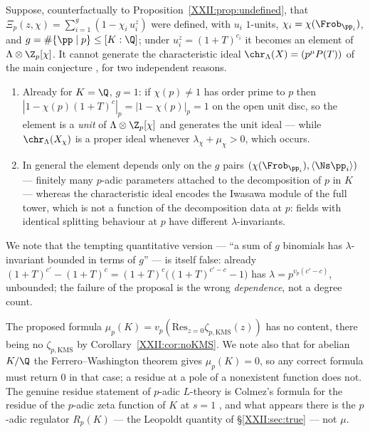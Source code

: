 \begin{proposition}\label{XXII:prop:bounded}
Suppose, counterfactually to Proposition~\ref{XXII:prop:undefined}, that
$\Xi_p(z,\chi)=\sum_{i=1}^g(1-\chi_i\,u_i^z)$ were defined, with $u_i$ $1$-units,
$\chi_i=\chi(\Frob_{\pp_i})$, and $g=\#\{\pp\mid p\}\le[K:\Q]$; under $u_i^z=(1+T)^{c_i}$ it
becomes an element of $\Lambda\otimes\Z_p[\chi]$. It cannot generate the characteristic
ideal $\chr_\Lambda(X)=(p^{\mu}P(T))$ of the main conjecture \cite{MazurWiles}, for two
independent reasons.
\begin{enumerate}
\item Already for $K=\Q$, $g=1$: if $\chi(p)\ne1$ has order prime to $p$ then
$|1-\chi(p)(1+T)^{c}|_p=|1-\chi(p)|_p=1$ on the open unit disc, so the element is a
\emph{unit} of $\Lambda\otimes\Z_p[\chi]$ and generates the unit ideal --- while
$\chr_\Lambda(X_\chi)$ is a proper ideal whenever $\lambda_\chi+\mu_\chi>0$, which occurs.
\item In general the element depends only on the $g$ pairs
$(\chi(\Frob_{\pp_i}),\langle\Ns\pp_i\rangle)$ --- finitely many $p$-adic parameters
attached to the decomposition of $p$ in $K$ --- whereas the characteristic ideal encodes the
Iwasawa module of the full tower, which is not a function of the decomposition data at $p$:
fields with identical splitting behaviour at $p$ have different $\lambda$-invariants.
\end{enumerate}
We note that the tempting quantitative version --- ``a sum of $g$ binomials has
$\lambda$-invariant bounded in terms of $g$'' --- is itself false: already
$(1+T)^{c'}-(1+T)^{c}=(1+T)^{c}\bigl((1+T)^{c'-c}-1\bigr)$ has
$\lambda=p^{v_p(c'-c)}$, unbounded; the failure of the proposal is the wrong
\emph{dependence}, not a degree count.
\end{proposition}

\begin{remark}[And $\mu$]\label{XXII:rem:mu}
The proposed formula $\mu_p(K)=v_p(\mathrm{Res}_{z=0}\zeta_{p,\mathrm{KMS}}(z))$ has no
content, there being no $\zeta_{p,\mathrm{KMS}}$ by Corollary~\ref{XXII:cor:noKMS}. We note also
that for abelian $K/\Q$ the Ferrero--Washington theorem \cite{FW} gives $\mu_p(K)=0$, so any
correct
formula must return $0$ in that case; a residue at a pole of a nonexistent function does not.
The genuine residue statement of $p$-adic $L$-theory is Colmez's formula for the residue of
the $p$-adic zeta function of $K$ at $s=1$ \cite{Colmez}, and what appears there is the
$p$-adic regulator $R_p(K)$ --- the Leopoldt quantity of \S\ref{XXII:sec:true} --- not $\mu$.
\end{remark}

